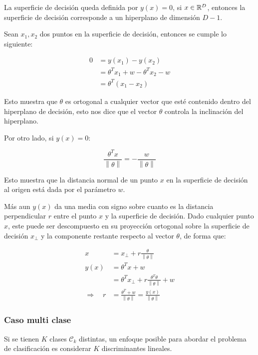 \vspace{1cm}
La superficie de decisión queda definida por $y(x)=0$, si $x\in{\mathbb R}^D$, entonces la superficie de decisión corresponde a un hiperplano de dimensión $D-1$.

Sean $x_1,x_2$ dos puntos en la superficie de decisión, entonces se cumple lo siguiente:

\begin{align}
    0 &= y(x_1) - y(x_2) \nonumber\\
      &= \theta^Tx_1 + w - \theta^Tx_2 - w \nonumber\\
      &= \theta^T(x_1-x_2)
\end{align}

Esto muestra que $\theta$ es ortogonal a cualquier vector que esté contenido dentro del hiperplano de decisión, esto nos dice que el vector $\theta$ controla la inclinación del hiperplano.

Por otro lado, si $y(x)=0$:

\begin{equation}
    \frac{\theta^Tx}{\left \| \theta \right \|} = -\frac{w}{\left \| \theta \right \|}
\end{equation}

Esto muestra que la distancia normal de un punto $x$ en la superficie de decisión al origen está dada por el parámetro $w$.

Más aun $y(x)$ da una media con signo sobre cuanto es la distancia perpendicular $r$ entre el punto $x$ y la superficie de decisión. Dado cualquier punto $x$, este puede ser descompuesto en su proyección ortogonal sobre la superficie de decisión $x_{\bot}$ y la componente restante respecto al vector $\theta$, de forma que:

\begin{align}
    x &= x_{\bot}+r\frac{\theta}{\left \| \theta \right \|}\\
    y(x) &= \theta^Tx+w\\
    &= \theta^Tx_{\bot} + r\frac{\theta^T\theta}{\left \| \theta \right \|} + w\\
    \Rightarrow \quad r &= \frac{\theta^T+w}{\left \| \theta \right \|} 
    = \frac{y(x)}{\left \| \theta \right \|}
\end{align}

\newpage
\subsubsection{Caso multi clase}

Si se tienen $K$ clases $\mathcal{C}_k$ distintas, un enfoque posible para abordar el problema de clasificación es considerar $K$ discriminantes lineales.

